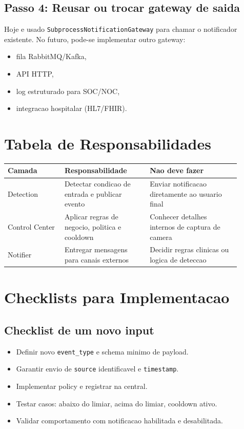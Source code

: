 \documentclass[12pt,a4paper]{article}
\begin{document}
\subsection{Passo 4: Reusar ou trocar gateway de saida}
Hoje e usado \texttt{SubprocessNotificationGateway} para chamar o notificador existente. No futuro, pode-se implementar outro gateway:
\begin{itemize}
    \item fila RabbitMQ/Kafka,
    \item API HTTP,
    \item log estruturado para SOC/NOC,
    \item integracao hospitalar (HL7/FHIR).
\end{itemize}

\section{Tabela de Responsabilidades}
\begin{center}
\renewcommand{\arraystretch}{1.25}
\begin{tabular}{>{\raggedright\arraybackslash}p{0.22\linewidth} >{\raggedright\arraybackslash}p{0.33\linewidth} >{\raggedright\arraybackslash}p{0.35\linewidth}}
\toprule
\textbf{Camada} & \textbf{Responsabilidade} & \textbf{Nao deve fazer} \\
\midrule
Detection & Detectar condicao de entrada e publicar evento & Enviar notificacao diretamente ao usuario final \\
Control Center & Aplicar regras de negocio, politica e cooldown & Conhecer detalhes internos de captura de camera \\
Notifier & Entregar mensagens para canais externos & Decidir regras clinicas ou logica de deteccao \\
\bottomrule
\end{tabular}
\end{center}

\section{Checklists para Implementacao}
\subsection*{Checklist de um novo input}
\begin{itemize}
    \item[ ] Definir novo \texttt{event\_type} e schema minimo de payload.
    \item[ ] Garantir envio de \texttt{source} identificavel e \texttt{timestamp}.
    \item[ ] Implementar policy e registrar na central.
    \item[ ] Testar casos: abaixo do limiar, acima do limiar, cooldown ativo.
    \item[ ] Validar comportamento com notificacao habilitada e desabilitada.
\end{itemize}
\end{document}
